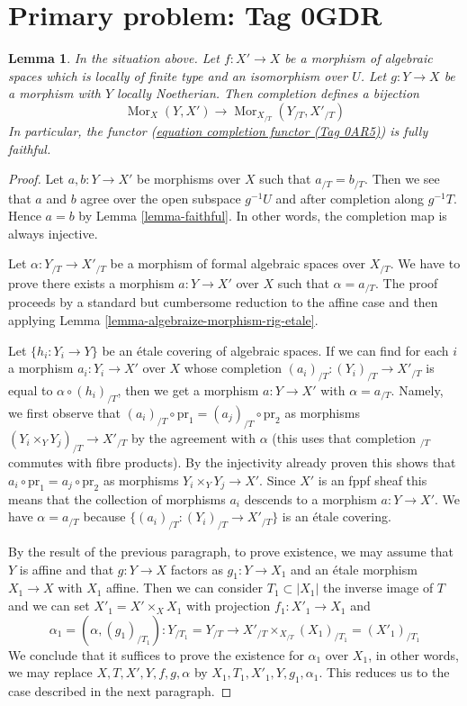 \documentclass{amsart}
\theoremstyle{plain}
\newtheorem{lemma}[subsection]{Lemma}
\theoremstyle{definition}
\theoremstyle{remark}
\numberwithin{equation}{subsection}
\def\Mor{\mathop{\mathrm{Mor}}\nolimits}
\begin{document}
\section*{Primary problem: Tag 0GDR}
\begin{lemma}
\label{lemma-completion-functor-fully-faithful}
In the situation above. Let $f : X' \to X$ be a morphism of algebraic spaces
which is locally of finite type and an isomorphism over $U$. Let
$g : Y \to X$ be a morphism with $Y$ locally Noetherian. Then completion
defines a bijection
$$
\Mor_X(Y, X') \longrightarrow \Mor_{X_{/T}}(Y_{/T}, X'_{/T})
$$
In particular, the functor (\href{https://stacks.math.columbia.edu/tag/0AR5}{equation completion functor (Tag 0AR5)}) is
fully faithful.
\end{lemma}

\begin{proof}
Let $a, b : Y \to X'$ be morphisms over $X$ such that
$a_{/T} = b_{/T}$. Then we see that $a$ and $b$ agree over the open
subspace $g^{-1}U$ and after completion along $g^{-1}T$.
Hence $a = b$ by Lemma \ref{lemma-faithful}.
In other words, the completion map is always injective.

\medskip\noindent
Let $\alpha : Y_{/T} \to X'_{/T}$ be a morphism of formal algebraic spaces
over $X_{/T}$. We have to prove there exists a morphism $a : Y \to X'$
over $X$ such that $\alpha = a_{/T}$. The proof proceeds by a standard
but cumbersome reduction to the affine case and then applying
Lemma \ref{lemma-algebraize-morphism-rig-etale}.

\medskip\noindent
Let $\{h_i : Y_i \to Y\}$ be an \'etale covering of algebraic spaces.
If we can find for each $i$ a morphism $a_i : Y_i \to X'$ over $X$
whose completion $(a_i)_{/T} : (Y_i)_{/T} \to X'_{/T}$ is equal to
$\alpha \circ (h_i)_{/T}$, then we get a morphism $a : Y \to X'$
with $\alpha = a_{/T}$. Namely, we first observe that
$(a_i)_{/T} \circ \text{pr}_1 = (a_j)_{/T} \circ \text{pr}_2$
as morphisms $(Y_i \times_Y Y_j)_{/T} \to X'_{/T}$ by the
agreement with $\alpha$ (this uses that completion ${}_{/T}$ commutes
with fibre products). By the injectivity already proven this shows that
$a_i \circ \text{pr}_1 = a_j \circ \text{pr}_2$ as morphisms
$Y_i \times_Y Y_j \to X'$. Since $X'$ is an fppf sheaf this means that
the collection of morphisms $a_i$ descends to a morphism $a : Y \to X'$.
We have $\alpha = a_{/T}$ because $\{(a_i)_{/T} : (Y_i)_{/T} \to X'_{/T}\}$
is an \'etale covering.

\medskip\noindent
By the result of the previous paragraph, to prove existence,
we may assume that $Y$ is affine and that $g : Y \to X$ factors
as $g_1 : Y \to X_1$ and an \'etale morphism $X_1 \to X$ with $X_1$ affine.
Then we can consider $T_1 \subset |X_1|$ the inverse image of $T$
and we can set $X'_1 = X' \times_X X_1$ with projection $f_1 : X'_1 \to X_1$
and
$$
\alpha_1 = (\alpha, (g_1)_{/T_1}) :
Y_{/T_1} = Y_{/T}
\longrightarrow
X'_{/T} \times_{X_{/T}} (X_1)_{/T_1} = (X'_1)_{/T_1}
$$
We conclude that it suffices to prove the existence for $\alpha_1$
over $X_1$, in other words, we may replace $X, T, X', Y, f, g, \alpha$
by $X_1, T_1, X'_1, Y, g_1, \alpha_1$.
This reduces us to the case described in the next paragraph.


\end{proof}
\end{document}

